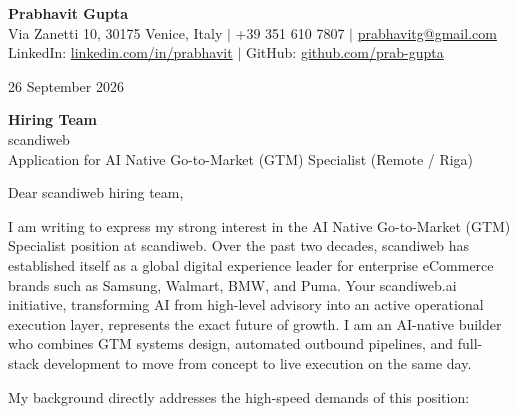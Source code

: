 \documentclass[11pt,a4paper]{article}
\begin{document}
\textbf{\large Prabhavit Gupta}\\[2pt]
{\small Via Zanetti 10, 30175 Venice, Italy \quad $\vert$ \quad +39 351 610 7807 \quad $\vert$ \quad \href{mailto:prabhavitg@gmail.com}{prabhavitg@gmail.com}\\[1pt]
LinkedIn: \href{https://www.linkedin.com/in/prabhavit/}{linkedin.com/in/prabhavit} \quad $\vert$ \quad GitHub: \href{https://github.com/prab-gupta}{github.com/prab-gupta}}

\vspace{4pt}
26 September 2026

\vspace{2pt}
\textbf{Hiring Team}\\
scandiweb\\
Application for AI Native Go-to-Market (GTM) Specialist (Remote / Riga)

\vspace{2pt}
Dear scandiweb hiring team,

I am writing to express my strong interest in the AI Native Go-to-Market (GTM) Specialist position at scandiweb. Over the past two decades, scandiweb has established itself as a global digital experience leader for enterprise eCommerce brands such as Samsung, Walmart, BMW, and Puma. Your scandiweb.ai initiative, transforming AI from high-level advisory into an active operational execution layer, represents the exact future of growth. I am an AI-native builder who combines GTM systems design, automated outbound pipelines, and full-stack development to move from concept to live execution on the same day.

My background directly addresses the high-speed demands of this position:
\end{document}
